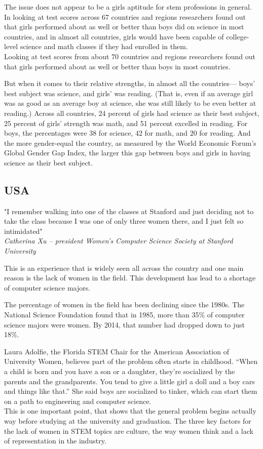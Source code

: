 	The issue does not appear to be a girls aptitude for stem professions in general. In looking at test scores across 67 countries and regions researchers found out that girls performed about as well or better than boys did on science in most countries, and in almost all countries, girls would have been capable of college-level science and math classes if they had enrolled in them.\\
	
	Looking at test scores from about 70 countries and regions researchers found out that girls performed about as well or better than boys in most countries.
		
	But when it comes to their relative strengths, in almost all the countries— boys’ best subject was science, and girls’ was reading. (That is, even if an average girl was as good as an average boy at science, she was still likely to be even better at reading.) Across all countries, 24 percent of girls had science as their best subject, 25 percent of girls’ strength was math, and 51 percent excelled in reading. For boys, the percentages were 38 for science, 42 for math, and 20 for reading. And the more gender-equal the country, as measured by the World Economic Forum’s Global Gender Gap Index, the larger this gap between boys and girls in having science as their best subject.
	
	\subsection{USA}
	
	"I remember walking into one of the classes at Stanford and just deciding not to take the class because I was one of only three women there, and I just felt so intimidated"\cite{tusa1}\\
	\textit{Catherina Xu – president Women’s Computer Science Society at Stanford University}
	\newline
	
	This is an experience that is widely seen all across the country and one main reason is the lack of women in the field. This development has lead to a shortage of computer science majors.
	
	The percentage of women in the field has been declining since the 1980s. The National Science Foundation found that in 1985, more than 35\% of computer science majors were women. By 2014, that number had dropped down to just 18\%.
	
	Laura Adolfie, the Florida STEM Chair for the American Association of University Women, believes part of the problem often starts in childhood. “When a child is born and you have a son or a daughter, they’re socialized by the parents and the grandparents. You tend to give a little girl a doll and a boy cars and things like that.” \cite{tusa1} She said boys are socialized to tinker, which can start them on a path to engineering and computer science.\\
	\newline
	This is one important point, that shows that the general problem begins actually way before studying at the university and graduation. The three key factors for the lack of women in STEM topics are culture, the way women think and a lack of representation in the industry.
	
